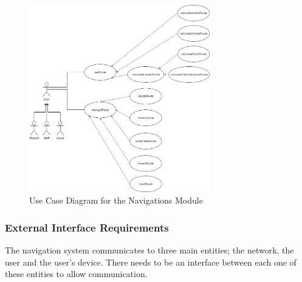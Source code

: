\documentclass[runningheads,a4paper]{article}
\begin{document}
\begin{figure}[H]
   	\centering
   	\includegraphics[width=0.7\textwidth]{Navigation-Module-Use-Case.jpg}
   	\caption{Use Case Diagram for the Navigations Module}
\end{figure}

\subsubsection {External Interface Requirements}
The navigation system communicates to three main entities; the network, the user and the user’s device. There needs to be an interface between each one of these entities to allow communication.
\end{document}

